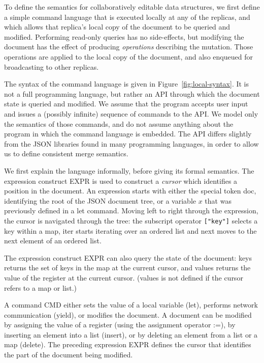 \documentclass[10pt,journal,compsoc]{IEEEtran}
\begin{document}
To define the semantics for collaboratively editable data structures, we first define a simple command language that is executed locally at any of the replicas, and which allows that replica's local copy of the document to be queried and modified. Performing read-only queries has no side-effects, but modifying the document has the effect of producing \emph{operations} describing the mutation. Those operations are applied to the local copy of the document, and also enqueued for broadcasting to other replicas.

The syntax of the command language is given in Figure~\ref{fig:local-syntax}. It is not a full programming language, but rather an API through which the document state is queried and modified. We assume that the program accepts user input and issues a (possibly infinite) sequence of commands to the API. We model only the semantics of those commands, and do not assume anything about the program in which the command language is embedded. The API differs slightly from the JSON libraries found in many programming languages, in order to allow us to define consistent merge semantics.

We first explain the language informally, before giving its formal semantics. The expression construct EXPR is used to construct a \emph{cursor} which identifies a position in the document. An expression starts with either the special token \textsf{doc}, identifying the root of the JSON document tree, or a variable $x$ that was previously defined in a \textsf{let} command. Moving left to right through the expression, the cursor is navigated through the tree: the subscript operator \verb|["key"]| selects a key within a map, \textsf{iter} starts iterating over an ordered list and \textsf{next} moves to the next element of an ordered list.

The expression construct EXPR can also query the state of the document: \textsf{keys} returns the set of keys in the map at the current cursor, and \textsf{values} returns the value of the register at the current cursor. (\textsf{values} is not defined if the cursor refers to a map or list.)

A command CMD either sets the value of a local variable (\textsf{let}), performs network communication (\textsf{yield}), or modifies the document. A document can be modified by assigning the value of a register (using the assignment operator :=), by inserting an element into a list (\textsf{insert}), or by deleting an element from a list or a map (\textsf{delete}). The preceding expression EXPR defines the cursor that identifies the part of the document being modified.
\end{document}
